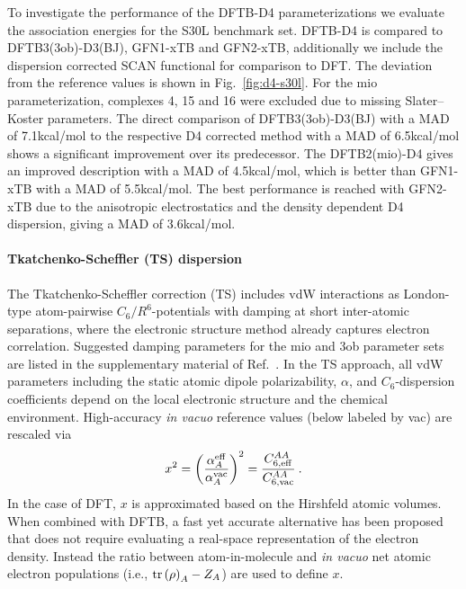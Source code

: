 \documentclass[reprint,onecolumn,superscriptaddress]{revtex4-1}
\begin{document}
To investigate the performance of the DFTB-D4 parameterizations we evaluate the
association energies for the S30L benchmark set.\cite{sure2015,brandenburg2018}
DFTB-D4 is compared to DFTB3(3ob)-D3(BJ),\cite{brandenburg2014}
GFN1-xTB\cite{grimme2017} and GFN2-xTB,\cite{bannwarth2019} additionally we
include the dispersion corrected SCAN\cite{sun2015} functional for comparison to
DFT.  The deviation from the reference values is shown in
Fig.~\ref{fig:d4-s30l}. For the mio parameterization, complexes 4, 15 and 16 were
excluded due to missing Slater--Koster parameters.  The direct comparison of
DFTB3(3ob)-D3(BJ) with a MAD of 7.1\;kcal/mol to the respective D4 corrected
method with a MAD of 6.5\;kcal/mol shows a significant improvement over its
predecessor. The DFTB2(mio)-D4 gives an improved description with a MAD of
4.5\;kcal/mol, which is better than GFN1-xTB with a MAD of 5.5\;kcal/mol. The
best performance is reached with GFN2-xTB due to the anisotropic electrostatics
and the density dependent D4 dispersion, giving a MAD of 3.6\;kcal/mol.


\paragraph{Tkatchenko-Scheffler (TS) dispersion}

The Tkatchenko-Scheffler correction (TS)\cite{Tkatchenko2009} includes vdW
interactions as London-type atom-pairwise $C_6/R^6$-potentials with damping at
short inter-atomic separations, where the electronic structure method already
captures electron correlation. Suggested damping parameters for the mio and 3ob
parameter sets are listed in the supplementary material of
Ref.~\cite{hourahine-JCP-152-124101}. In the TS approach, all vdW parameters
including the static atomic dipole polarizability, $\alpha$, and
$C_6$-dispersion coefficients depend on the local electronic structure and the
chemical environment.\cite{Tkatchenko2009} High-accuracy \textit{in vacuo}
reference values (below labeled by vac) are rescaled via
\begin{equation}
  x^2 = \left(\frac{\alpha_A^{\rm eff}}{\alpha_A^{\rm vac}}\right)^2 =
  \frac{C_{6,{\rm eff}}^{AA}}{C_{6,{\rm vac}}^{AA}}\:.
  \label{eq:MBDTS_effective_alphaC6}
\end{equation}
In the case of DFT, $x$ is approximated based on the Hirshfeld atomic
volumes.\cite{Hirshfeld1977} When combined with DFTB, a fast yet accurate
alternative has been proposed\cite{Stoehr2016} that does not require
evaluating a real-space representation of the electron density. Instead the
ratio between atom-in-molecule and \textit{in vacuo} net atomic electron
populations (i.e., $\operatorname{tr}\left(\rho\right)_A - Z_A$) are used to define $x$.
\end{document}
